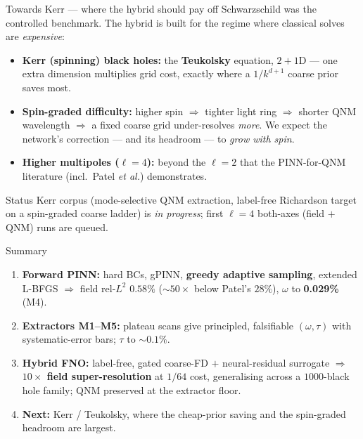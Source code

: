 \documentclass[aspectratio=169, 11pt]{beamer}
\newcommand{\bh}{black hole}
\newcommand{\qnm}{QNM}
\begin{document}
\begin{frame}{Towards Kerr --- where the hybrid should pay off}
  Schwarzschild was the controlled benchmark. The hybrid is built for the regime where
  classical solves are \emph{expensive}:
  \medskip
  \begin{itemize}\small
    \item \textbf{Kerr (spinning) \bh{}s:} the \textbf{Teukolsky} equation, $2{+}1$D ---
          one extra dimension multiplies grid cost, exactly where a $1/k^{d+1}$ coarse
          prior saves most.
    \item \textbf{Spin-graded difficulty:} higher spin $\Rightarrow$ tighter light ring
          $\Rightarrow$ shorter \qnm{} wavelength $\Rightarrow$ a fixed coarse grid
          under-resolves \emph{more}. We expect the network's correction --- and its
          headroom --- to \emph{grow with spin}.
    \item \textbf{Higher multipoles ($\ell\!=\!4$):} beyond the $\ell\!=\!2$ that the
          PINN-for-QNM literature (incl.\ Patel \emph{et al.}) demonstrates.
  \end{itemize}
  \medskip
  \begin{block}{\footnotesize Status}
    \footnotesize
    Kerr corpus (mode-selective \qnm{} extraction, label-free Richardson target on a
    spin-graded coarse ladder) is \emph{in progress}; first $\ell\!=\!4$ both-axes
    (field $+$ \qnm{}) runs are queued.
  \end{block}
\end{frame}

\begin{frame}{Summary}
  \begin{enumerate}
    \item \textbf{Forward PINN:} hard BCs, gPINN, \textbf{greedy adaptive sampling},
          extended L-BFGS $\Rightarrow$ field rel-$L^2$ $0.58\%$ ($\sim\!50\times$ below
          Patel's $28\%$), $\omega$ to \textbf{0.029\%} (M4).
    \medskip
    \item \textbf{Extractors M1--M5:} plateau scans give principled, falsifiable
          $(\omega,\tau)$ with systematic-error bars; $\tau$ to $\sim\!0.1\%$.
    \medskip
    \item \textbf{Hybrid FNO:} label-free, gated coarse-FD $+$ neural-residual
          surrogate $\Rightarrow$ \textbf{$10\times$ field super-resolution} at
          $1/64$ cost, generalising across a $1000$-\bh{} family; \qnm{} preserved
          at the extractor floor.
    \medskip
    \item \textbf{Next:} Kerr / Teukolsky, where the cheap-prior saving and the
          spin-graded headroom are largest.
  \end{enumerate}
\end{frame}
\end{document}
